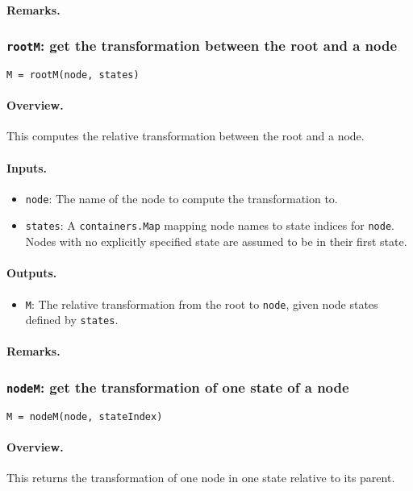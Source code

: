 \paragraph{Remarks.}

\subsubsection{\texttt{rootM}: get the transformation between the root and a node}
\texttt{M = rootM(node, states)}
\paragraph{Overview.}
This computes the relative transformation between the root and a node.
\paragraph{Inputs.}
\begin{itemize}
	\item \texttt{node}: The name of the node to compute the transformation to.
	\item \texttt{states}: A \texttt{containers.Map} mapping node names to state indices for \texttt{node}.
		Nodes with no explicitly specified state are assumed to be in their first state.
\end{itemize}
\paragraph{Outputs.}
\begin{itemize}
	\item \texttt{M}: The relative transformation from the root to \texttt{node},
		given node states defined by \texttt{states}.
\end{itemize}
\paragraph{Remarks.}

\subsubsection{\texttt{nodeM}: get the transformation of one state of a node}
\texttt{M = nodeM(node, stateIndex)}
\paragraph{Overview.}
This returns the transformation of one node in one state relative to its parent.
